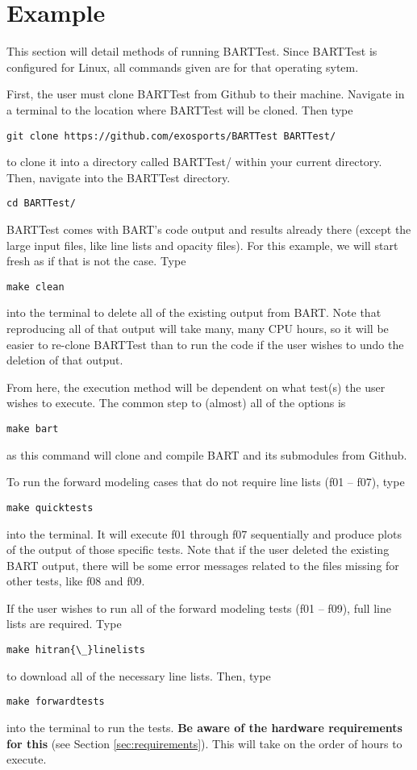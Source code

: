 \documentclass[letterpaper, 12pt]{article}
\begin{document}
\section{Example}
\label{sec:example}
This section will detail methods of running BARTTest. Since BARTTest is 
configured for Linux, all commands given are for that operating sytem.

First, the user must clone BARTTest from Github to their machine. 
Navigate in a terminal to the location where BARTTest will be cloned. 
Then type
\begin{verbatim}
git clone https://github.com/exosports/BARTTest BARTTest/
\end{verbatim}
to clone it into a directory called BARTTest/ within your current directory.
Then, navigate into the BARTTest directory.
\begin{verbatim}
cd BARTTest/
\end{verbatim}

BARTTest comes with BART's code output and results already there (except the large input files, like line lists and opacity files). For this example, we will start fresh as if that is not the case. Type
\begin{verbatim}
make clean
\end{verbatim}
into the terminal to delete all of the existing output from BART. Note that 
reproducing all of that output will take many, many CPU hours, so it will 
be easier to re-clone BARTTest than to run the code if the user wishes to 
undo the deletion of that output.

From here, the execution method will be dependent on what test(s) the user 
wishes to execute. The common step to (almost) all of the options is
\begin{verbatim}
make bart
\end{verbatim}
as this command will clone and compile BART and its submodules from Github. 

To run the forward modeling cases that do not require line lists (f01 
-- f07), type
\begin{verbatim}
make quicktests
\end{verbatim}
into the terminal. It will execute f01 through f07 sequentially and produce 
plots of the output of those specific tests. Note that if the user deleted 
the existing BART output, there will be some error messages related to the 
files missing for other tests, like f08 and f09.

If the user wishes to run all of the forward modeling tests (f01 -- f09), full line lists are required.
Type
\begin{verbatim}
make hitran{\_}linelists
\end{verbatim}
to download all of the necessary line lists. Then, type
\begin{verbatim}
make forwardtests
\end{verbatim}
into the terminal to run the tests. \textbf{Be aware of the hardware requirements for this} 
(see Section \ref{sec:requirements}). This will take on the order of hours 
to execute.
\end{document}
